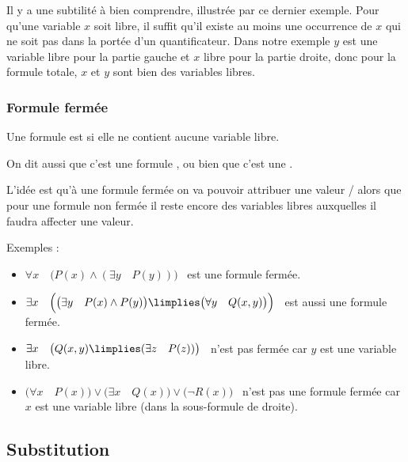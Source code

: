 \documentclass[11pt,class=report,crop=false]{standalone}
\begin{document}
Il y a une subtilité à bien comprendre, illustrée par ce dernier exemple.
Pour qu'une variable $x$ soit libre, il suffit qu'il existe au moins une occurrence de $x$ qui ne soit pas dans la portée d'un quantificateur. Dans notre exemple $y$ est une variable libre pour la partie gauche et $x$ libre pour la partie droite, donc pour la formule totale, $x$ et $y$ sont bien des variables libres.


\subsubsection{Formule fermée}


\begin{definition}
Une formule est  si elle ne contient aucune variable libre.	
\end{definition}
On dit aussi que c'est une formule , ou bien que c'est une .

L'idée est qu'à une formule fermée on va pouvoir attribuer une valeur \ltrue/\lfalse{} alors que pour une formule non fermée il reste encore des variables libres auxquelles il faudra affecter une valeur.

Exemples :
\begin{itemize}
	\item $\forall x \quad \big( P(x) \land (\exists y \quad P(y)) \big)$ \ est une formule fermée.
	
	\item $\exists x \quad \Big( \big(\exists y \quad P(x) \land P(y)\big) \limplies \big(\forall y \quad Q(x,y)\big) \Big)$ \ est aussi une formule fermée.
	
	\item $\exists x \quad \big( Q(x,y) \limplies (\exists z \quad P(z)) \big)$ \ n'est pas fermée car $y$ est une variable libre.
	
	\item $\big(\forall x \quad P(x)\big) \lor \big( \exists x \quad Q(x) \big) \lor \big( \lnot R(x) \big)$ \ n'est pas une formule fermée car $x$ est une variable libre (dans la sous-formule de droite).
\end{itemize}


\subsection{Substitution}

\end{document}
